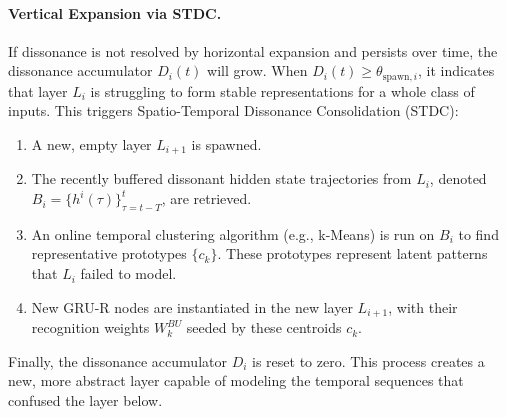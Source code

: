 \documentclass{article}
\begin{document}
\paragraph{Vertical Expansion via STDC.} If dissonance is not resolved by horizontal expansion and persists over time, the dissonance accumulator $D_i(t)$ will grow. When $D_i(t) \ge \theta_{\text{spawn},i}$, it indicates that layer $L_i$ is struggling to form stable representations for a whole class of inputs. This triggers Spatio-Temporal Dissonance Consolidation (STDC):
\begin{enumerate}
    \item A new, empty layer $L_{i+1}$ is spawned.
    \item The recently buffered dissonant hidden state trajectories from $L_i$, denoted $B_i = \{h^i(\tau)\}_{\tau=t-T}^{t}$, are retrieved.
    \item An online temporal clustering algorithm (e.g., k-Means) is run on $B_i$ to find representative prototypes $\{c_k\}$. These prototypes represent latent patterns that $L_i$ failed to model.
    \item New GRU-R nodes are instantiated in the new layer $L_{i+1}$, with their recognition weights $W_k^{BU}$ seeded by these centroids $c_k$.
\end{enumerate}
Finally, the dissonance accumulator $D_i$ is reset to zero. This process creates a new, more abstract layer capable of modeling the temporal sequences that confused the layer below.
\end{document}
